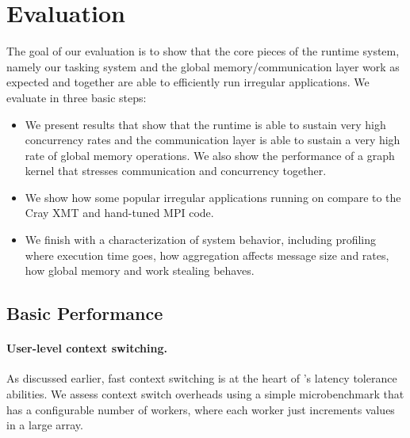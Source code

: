 \section{Evaluation}
\label{sec:evaluation}

The goal of our evaluation is to show that the core pieces of the \Grappa
runtime system, namely our tasking system and the global memory/communication
layer work as expected and together are able to efficiently run irregular
applications. We evaluate \Grappa in three basic steps:

\begin{itemize}

\item We present results that show that the \Grappa runtime is able to sustain
very high concurrency rates and the communication layer is able to sustain a
very high rate of global memory operations. We also show the performance of a
graph kernel that stresses communication and concurrency together.

\item We show how some popular irregular applications running on \Grappa
compare to the Cray XMT and hand-tuned MPI code.

\item We finish with a characterization of system behavior, including
profiling where execution time goes, how aggregation affects message size and
rates, how global memory and work stealing behaves.

\end{itemize}

\subsection{Basic \Grappa Performance}
\label{eval:basic}

\paragraph{User-level context switching.}

As discussed earlier, fast context switching is at the heart of \Grappa's
latency tolerance abilities. We assess context switch overheads using a simple
microbenchmark that has a configurable number of workers, where each worker 
just increments values in a large array. 

